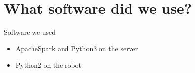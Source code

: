 \section{What software did we use?}
    
    \frame{\sectionpage}
    
    \begin{frame}{Software we used}
		\begin{itemize}
			\item ApacheSpark and Python3 on the server
			\pause
			\item Python2 on the robot
		\end{itemize}
	\end{frame}